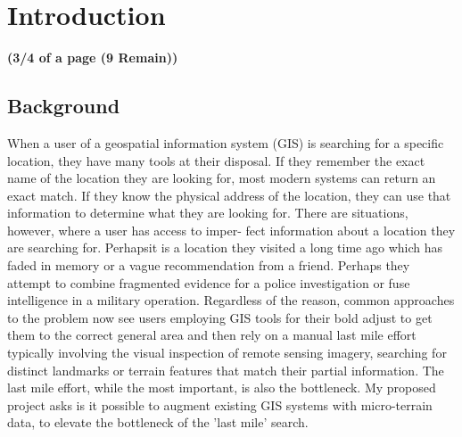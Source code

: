 \section{Introduction}
\label{section:introduction}
\textbf{(3/4 of a page (9 Remain))}

\subsection{Background}
When a user of a geospatial information system (GIS) is searching for a specific location, they have many tools at their disposal. 
If they remember the exact name of the location they are looking for,
most modern systems can return an exact match. 
If they know the physical address of the location, they can use that information to
determine what they are looking for.
There are situations, however, where a user has access to imper-
fect information about a location they are searching for. 
Perhapsit is a location they visited a long time ago which has faded in
memory or a vague recommendation from a friend. 
Perhaps they attempt to combine fragmented evidence for a police investigation
or fuse intelligence in a military operation.
Regardless of the reason, common approaches to the problem
now see users employing GIS tools for their bold adjust to get them
to the correct general area and then rely on a manual last mile effort
typically involving the visual inspection of remote sensing imagery,
searching for distinct landmarks or terrain features that match their
partial information. 
The last mile effort, while the most important, is also the bottleneck.
My proposed project asks is it possible to augment existing GIS
systems with micro-terrain data, to elevate the bottleneck of the ’last
mile’ search.

